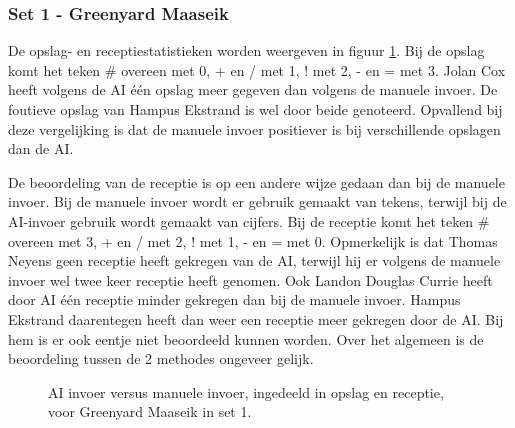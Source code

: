 \subsubsection{Set 1 - Greenyard Maaseik}
\label{sec:PL3_Greenyard1}
De opslag- en receptiestatistieken worden weergeven in figuur \ref{fig:PL3ServeMaaseik1}. Bij de opslag komt het teken \# overeen met 0, + en / met 1, ! met 2, - en = met 3.
Jolan Cox heeft volgens de AI één opslag meer gegeven dan volgens de manuele invoer. De foutieve opslag van Hampus Ekstrand is wel door beide genoteerd. Opvallend bij deze vergelijking is dat de manuele invoer positiever is bij verschillende opslagen dan de AI.

De beoordeling van de receptie is op een andere wijze gedaan dan bij de manuele invoer. Bij de manuele invoer wordt er gebruik gemaakt van tekens, terwijl bij de AI-invoer gebruik wordt gemaakt van cijfers. Bij de receptie komt het teken \# overeen met 3, + en / met 2, ! met 1, - en = met 0.
Opmerkelijk is dat Thomas Neyens geen receptie heeft gekregen van de AI, terwijl hij er volgens de manuele invoer wel twee keer receptie heeft genomen. Ook Landon Douglas Currie heeft door AI één receptie minder gekregen dan bij de manuele invoer. Hampus Ekstrand daarentegen heeft dan weer een receptie meer gekregen door de AI. Bij hem is er ook eentje niet beoordeeld kunnen worden. Over het algemeen is de beoordeling tussen de 2 methodes ongeveer gelijk.

\begin{figure}[ht]
\centering
{}
\caption{AI invoer versus manuele invoer, ingedeeld in opslag en receptie, voor Greenyard Maaseik in set 1.}
\label{fig:PL3ServeMaaseik1}
\end{figure}

